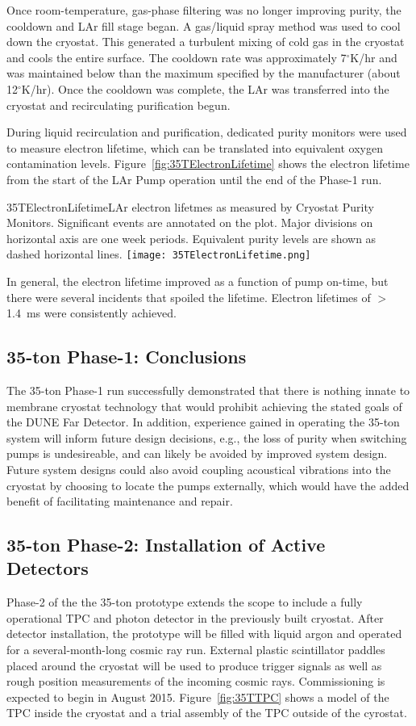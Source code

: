 Once room-temperature, gas-phase filtering was no longer improving
purity, the cooldown and LAr fill stage began.  A gas/liquid spray
method was used to cool down the cryostat.  This generated a turbulent
mixing of cold gas in the cryostat and cools the entire surface.  The
cooldown rate was approximately 7$^\circ$K/hr and was maintained below
than the maximum specified by the manufacturer (about 12$^\circ$K/hr).
Once the cooldown was complete, the LAr was transferred into the
cryostat and recirculating purification begun.

During liquid recirculation and purification, dedicated
purity monitors were used to measure electron lifetime, which can 
be translated into equivalent oxygen contamination levels.
Figure~\ref{fig:35TElectronLifetime} shows the electron lifetime from the start of the
LAr Pump operation until the end of the Phase-1 run. 
\begin{cdrfigure}{35TElectronLifetime}{LAr electron lifetmes as measured by 
Cryostat Purity Monitors. Significant events are annotated on the plot. Major divisions on horizontal axis 
are one week periods. Equivalent purity levels are shown as dashed horizontal lines.}
  \texttt{[image: 35TElectronLifetime.png]}
\end{cdrfigure}
In general, the electron lifetime improved as a function of pump 
on-time, but there were several incidents that spoiled the lifetime.
Electron lifetimes of $>$1.4~ms were consistently achieved.


\subsection{35-ton Phase-1: Conclusions}
The 35-ton Phase-1 run successfully demonstrated that there is nothing innate to
membrane cryostat technology that would prohibit achieving the stated goals of the
DUNE Far Detector. In addition, experience gained in operating the 35-ton system
will inform future design decisions, e.g., the loss of purity when switching pumps is
undesireable, and can likely be avoided by improved system design. Future system
designs could also avoid coupling acoustical vibrations into the cryostat by choosing
to locate the pumps externally, which would have the added benefit of facilitating
maintenance and repair.

\subsection{35-ton Phase-2: Installation of Active Detectors}
Phase-2 of the the 35-ton prototype extends the scope to include a
fully operational TPC and photon detector in the previously built
cryostat.  After detector installation, the prototype will be filled
with liquid argon and operated for a several-month-long cosmic ray
run.  External plastic scintillator paddles placed around the cryostat
will be used to produce trigger signals as well as rough position
measurements of the incoming cosmic rays.  Commissioning is expected
to begin in August 2015.  Figure~\ref{fig:35TTPC} shows a model of the
TPC inside the cryostat and a trial assembly of the TPC outside of the
cyrostat.

